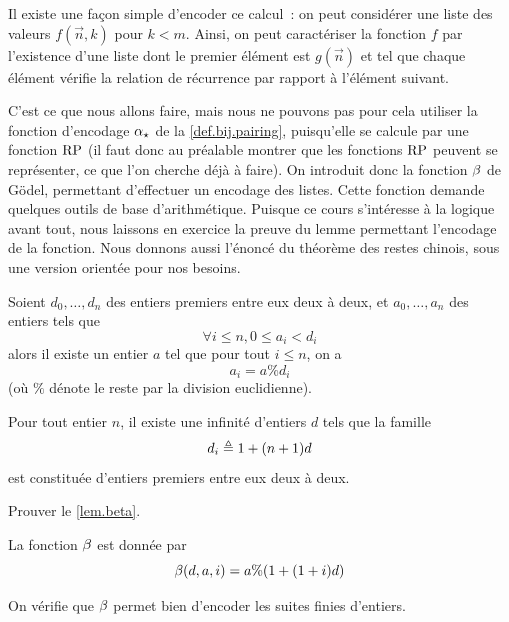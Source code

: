 Il existe une façon simple d'encoder ce calcul~: on peut considérer une liste
des valeurs $f(\vec n,k)$ pour $k < m$. Ainsi, on peut caractériser la fonction
$f$ par l'existence d'une liste dont le premier élément est $g(\vec n)$ et tel
que chaque élément vérifie la relation de récurrence par rapport à l'élément
suivant.

C'est ce que nous allons faire, mais nous ne pouvons pas pour cela utiliser la
fonction d'encodage $\alpha_{\star}$ de la \cref{def.bij.pairing}, puisqu'elle
se calcule par une fonction $\operatorname{RP}$ (il faut donc au préalable montrer que les
fonctions $\operatorname{RP}$ peuvent se représenter, ce que l'on cherche déjà à faire). On
introduit donc la fonction $\godB$ de Gödel, permettant d'effectuer un encodage
des listes. Cette fonction demande quelques outils de base d'arithmétique.
Puisque ce cours s'intéresse à la logique avant tout, nous laissons en exercice
la preuve du lemme permettant l'encodage de la fonction. Nous donnons aussi
l'énoncé du théorème des restes chinois, sous une version orientée pour nos
besoins.

\begin{theorem}\label{thm.chinois}
  Soient $d_0,\ldots,d_n$ des entiers premiers entre eux deux à deux, et
  $a_0,\ldots,a_n$ des entiers tels que
  \[\forall i \leq n, 0 \leq a_i < d_i\]
  alors il existe un entier $a$ tel que pour tout $i \leq n$, on a
  \[a_i = a \% d_i\]
  (où $\%$ dénote le reste par la division euclidienne).
\end{theorem}

\begin{lemma}\label{lem.beta}
  Pour tout entier $n$, il existe une infinité d'entiers $d$ tels que la
  famille
  \[d_i \triangleq 1 + (n+1)d\]
  est constituée d'entiers premiers entre eux deux à deux.
\end{lemma}

\begin{exercise}
  Prouver le \cref{lem.beta}.
\end{exercise}

\begin{definition}\label{def.beta}
  La fonction $\godB$ est donnée par
  \[\beta(d,a,i) = a \% (1 + (1 + i) d)\]
  \index[notation]{$\godB$}
\end{definition}

On vérifie que $\godB$ permet bien d'encoder les
suites finies d'entiers.

